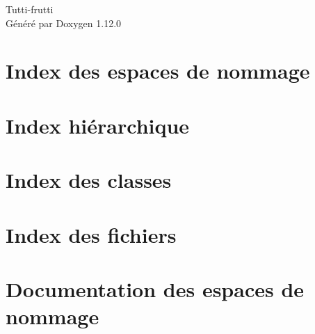 \documentclass[twoside]{book}
\newcommand{\+}{\discretionary{\mbox{\scriptsize$\hookleftarrow$}}{}{}}
\newcommand{\clearemptydoublepage}{%
    \newpage{\pagestyle{empty}\cleardoublepage}%
  }
\begin{document}
  \raggedbottom
    \hypersetup{pageanchor=false,
                bookmarksnumbered=true,
                pdfencoding=unicode
               }
  \begin{titlepage}
  \vspace*{7cm}
  \begin{center}%
  {\Large Tutti-\/frutti}\\
  \vspace*{1cm}
  {\large Généré par Doxygen 1.12.0}\\
  \end{center}
  \end{titlepage}
  \clearemptydoublepage
  \tableofcontents
  \clearemptydoublepage
  \hypersetup{pageanchor=true}
\chapter{Index des espaces de nommage}

\chapter{Index hiérarchique}

\chapter{Index des classes}

\chapter{Index des fichiers}

\chapter{Documentation des espaces de nommage}









\end{document}
